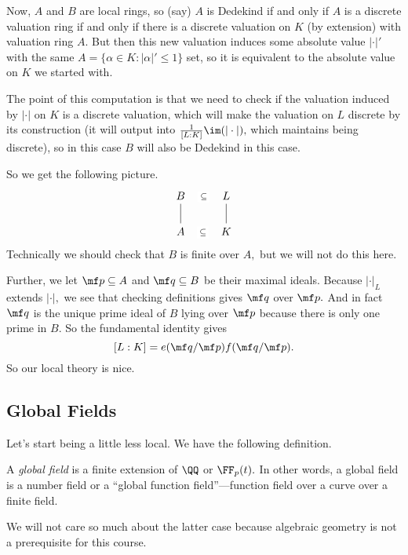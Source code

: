 \documentclass[../notes.tex]{subfiles}
\begin{document}
Now, $A$ and $B$ are local rings, so (say) $A$ is Dedekind if and only if $A$ is a discrete valuation ring if and only if there is a discrete valuation on $K$ (by extension) with valuation ring $A.$ But then this new valuation induces some absolute value $|\cdot|'$ with the same $A=\{\alpha\in K:|\alpha|'\le1\}$ set, so it is equivalent to the absolute value on $K$ we started with.

The point of this computation is that we need to check if the valuation induced by $|\cdot|$ on $K$ is a discrete valuation, which will make the valuation on $L$ discrete by its construction (it will output into $\frac1{[L:K]}\im(|\cdot|),$ which maintains being discrete), so in this case $B$ will also be Dedekind in this case.

So we get the following picture.
\[\begin{tikzcd}
	B & L \\
	A & K
	\arrow[no head, from=1-2, to=2-2]
	\arrow[no head, from=1-1, to=2-1]
	\arrow["\subseteq"{description}, draw=none, from=1-1, to=1-2]
	\arrow["\subseteq"{description}, draw=none, from=2-1, to=2-2]
\end{tikzcd}\]
Technically we should check that $B$ is finite over $A,$ but we will not do this here.

Further, we let $\mf p\subseteq A$ and $\mf q\subseteq B$ be their maximal ideals. Because $|\cdot|_L$ extends $|\cdot|,$ we see that checking definitions gives $\mf q$ over $\mf p.$ And in fact $\mf q$ is the unique prime ideal of $B$ lying over $\mf p$ because there is only one prime in $B.$ So the fundamental identity gives
\[[L:K]=e(\mf q/\mf p)f(\mf q/\mf p).\]
So our local theory is nice.

\subsection{Global Fields}
Let's start being a little less local. We have the following definition.
\begin{definition}
	A \textit{global field} is a finite extension of $\QQ$ or $\FF_p(t).$ In other words, a global field is a number field or a ``global function field''---function field over a curve over a finite field.
\end{definition}
We will not care so much about the latter case because algebraic geometry is not a prerequisite for this course.
\end{document}
